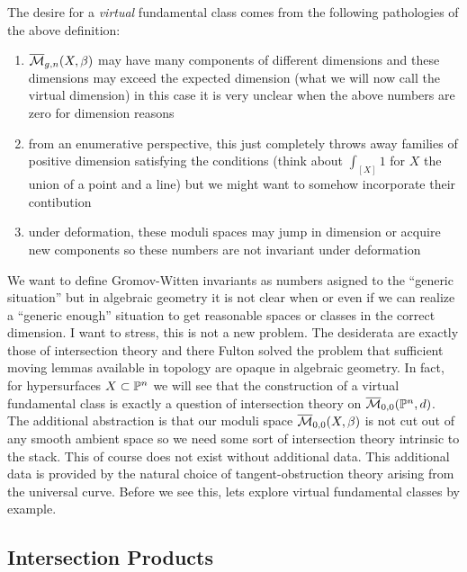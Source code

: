\documentclass[12pt]{article}
\newcommand{\Mbar}{\ol{\M}}
\begin{document}
The desire for a \textit{virtual} fundamental class comes from the following pathologies of the above definition:
\begin{enumerate}
\item $\Mbar_{g,n}(X, \beta)$ may have many components of different dimensions and these dimensions may exceed the expected dimension (what we will now call the virtual dimension) in this case it is very unclear when the above numbers are zero for dimension reasons
\item from an enumerative perspective, this just completely throws away families of positive dimension satisfying the conditions (think about $\int_{[X]} 1$ for $X$ the union of a point and a line) but we might want to somehow incorporate their contibution

\item under deformation, these moduli spaces may jump in dimension or acquire new components so these numbers are not invariant under deformation
\end{enumerate}
We want to define Gromov-Witten invariants as numbers asigned to the ``generic situation'' but in algebraic geometry it is not clear when or even if we can realize a ``generic enough'' situation to get reasonable spaces or classes in the correct dimension. I want to stress, this is not a new problem. The desiderata are exactly those of intersection theory and there Fulton solved the problem that sufficient moving lemmas available in topology are opaque in algebraic geometry. In fact, for hypersurfaces $X \subset \P^n$ we will see that the construction of a virtual fundamental class is exactly a question of intersection theory on $\Mbar_{0,0}(\P^n, d)$. The additional abstraction is that our moduli space $\Mbar_{0,0}(X, \beta)$ is not cut out of any smooth ambient space so we need some sort of intersection theory intrinsic to the stack. This of course does not exist without additional data. This additional data is provided by the natural choice of tangent-obstruction theory arising from the universal curve. Before we see this, lets explore virtual fundamental classes by example.

\subsection{Intersection Products}
\end{document}
